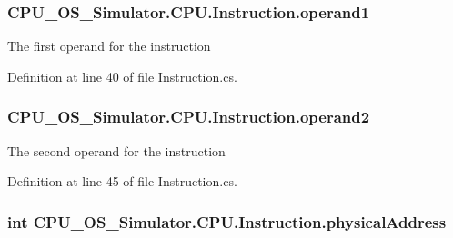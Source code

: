 \subsubsection[{operand1}]{ C\+P\+U\+\_\+\+O\+S\+\_\+\+Simulator.\+C\+P\+U.\+Instruction.\+operand1\hspace{0.3cm}{\ttfamily [private]}}\label{class_c_p_u___o_s___simulator_1_1_c_p_u_1_1_instruction_ab829270aeebc597814ded59f5265b452}


The first operand for the instruction 



Definition at line 40 of file Instruction.\+cs.

\hypertarget{class_c_p_u___o_s___simulator_1_1_c_p_u_1_1_instruction_a76e9ca211aca72f65c8ad9e11fbdad47}{}
\subsubsection[{operand2}]{ C\+P\+U\+\_\+\+O\+S\+\_\+\+Simulator.\+C\+P\+U.\+Instruction.\+operand2\hspace{0.3cm}{\ttfamily [private]}}\label{class_c_p_u___o_s___simulator_1_1_c_p_u_1_1_instruction_a76e9ca211aca72f65c8ad9e11fbdad47}


The second operand for the instruction 



Definition at line 45 of file Instruction.\+cs.

\hypertarget{class_c_p_u___o_s___simulator_1_1_c_p_u_1_1_instruction_a401c8f3740b63632e17db6f80b505a17}{}
\subsubsection[{physical\+Address}]{\setlength{\rightskip}{0pt plus 5cm}int C\+P\+U\+\_\+\+O\+S\+\_\+\+Simulator.\+C\+P\+U.\+Instruction.\+physical\+Address\hspace{0.3cm}{\ttfamily [private]}}\label{class_c_p_u___o_s___simulator_1_1_c_p_u_1_1_instruction_a401c8f3740b63632e17db6f80b505a17}


